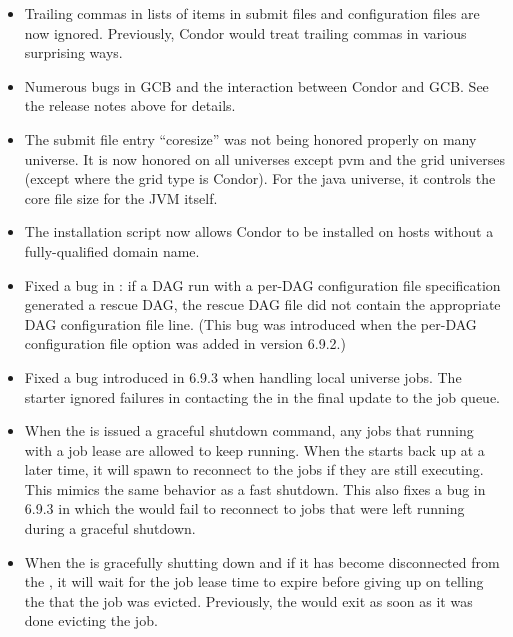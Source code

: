 \begin{itemize}

\item Trailing commas in lists of items in submit files and 
configuration files are now ignored.  Previously, Condor would treat trailing
commas in various surprising ways.

\item Numerous bugs in GCB and the interaction between Condor and GCB.
  See the release notes above for details.

\item The submit file entry ``coresize'' was not being honored properly on
many universe. It is now honored on all universes except pvm and the grid
universes (except where the grid type is Condor). For the java universe,
it controls the core file size for the JVM itself.

\item The  installation script now allows Condor
to be installed on hosts without a fully-qualified domain name.

\item Fixed a bug in : if a DAG run with a per-DAG
configuration file specification generated a rescue DAG, the rescue
DAG file did not contain the appropriate DAG configuration file line.
(This bug was introduced when the per-DAG configuration file option
was added in version 6.9.2.)

\item Fixed a bug introduced in 6.9.3 when handling local universe jobs.
The starter ignored failures in contacting the  in the
final update to the job queue.

\item When the  is issued a graceful shutdown command, any jobs
that running with a job lease are allowed to keep running. When the 
starts back up at a later time, it will spawn  to reconnect
to the jobs if they are still executing. This mimics the same behavior as
a fast shutdown.  This also fixes a bug in 6.9.3 in which the 
would fail to reconnect to jobs that were left running during a graceful
shutdown.

\item When the  is gracefully shutting down and if it
has become disconnected from the , it will wait for the
job lease time to expire before giving up on telling the 
that the job was evicted.  Previously, the  would exit
as soon as it was done evicting the job.


\end{itemize}
